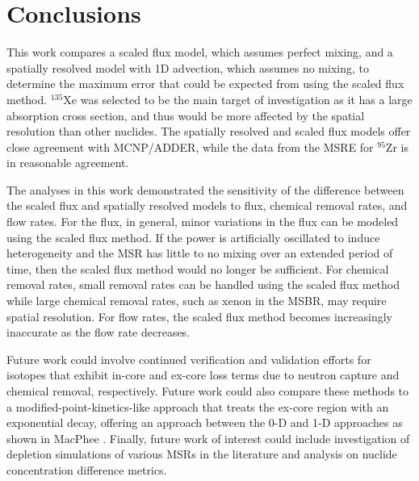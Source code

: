 \documentclass{style/nseJournal}
\begin{document}
\section{Conclusions}
This work compares a scaled flux model, which assumes perfect mixing, and a spatially resolved model with 1D advection, which assumes no mixing, to determine the maximum error that could be expected from using the scaled flux method.
$^{135}$Xe was selected to be the main target of investigation as it has a large absorption cross section, and thus would be more affected by the spatial resolution than other nuclides. 
The spatially resolved and scaled flux models offer close agreement with MCNP/ADDER, while the data from the MSRE for $^{95}$Zr is in reasonable agreement.

The analyses in this work demonstrated the sensitivity of the difference between the scaled flux and spatially resolved models to flux, chemical removal rates, and flow rates.
For the flux, in general, minor variations in the flux can be modeled using the scaled flux method.
If the power is artificially oscillated to induce heterogeneity and the MSR has little to no mixing over an extended period of time, then the scaled flux method would no longer be sufficient.
For chemical removal rates, small removal rates can be handled using the scaled flux method while large chemical removal rates, such as xenon in the MSBR, may require spatial resolution.
For flow rates, the scaled flux method becomes increasingly inaccurate as the flow rate decreases.

Future work could involve continued verification and validation efforts for isotopes that exhibit in-core and ex-core loss terms due to neutron capture and chemical removal, respectively.
Future work could also compare these methods to a modified-point-kinetics-like approach that treats the ex-core region with an exponential decay, offering an approach between the 0-D and 1-D approaches as shown in MacPhee \cite{macphee1958kinetics}.
Finally, future work of interest could include investigation of depletion simulations of various MSRs in the literature and analysis on nuclide concentration difference metrics.
\end{document}
